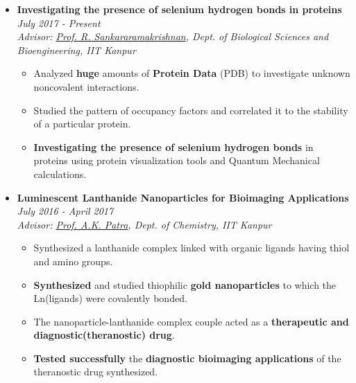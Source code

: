 \documentclass{article}
\begin{document}
\begin{itemize}

\item \textbf{Investigating the presence of selenium hydrogen bonds in proteins}
     \hfill\textit{July 2017 - Present}
     \\[0pt]  \textit{\small	 Advisor: \href{http://home.iitk.ac.in/~rsankar/}{Prof. R. Sankararamakrishnan}, Dept. of Biological Sciences and Bioengineering, IIT Kanpur}  
    \begin{itemize}
        \item Analyzed \textbf{huge} amounts of \textbf{Protein Data} (PDB) to investigate unknown noncovalent interactions.    
        \item Studied the pattern of occupancy factors and correlated it to the stability of a particular protein. 
        \item \textbf{Investigating the presence of selenium hydrogen bonds} in proteins using protein visualization tools and Quantum Mechanical calculations.
        
        \vspace{-1mm}
    \end{itemize}
    \vspace{1.5mm}
     \item \textbf{Luminescent Lanthanide Nanoparticles for Bioimaging Applications}
     \vspace{-1mm}
     \hfill\textit{July 2016 - April 2017}
     \\[3pt]  \textit{\small Advisor: \href{https://sites.google.com/site/ashiskpatra/} {Prof. A.K. Patra}, Dept. of Chemistry, IIT Kanpur } 
    \begin{itemize}
        \item Synthesized a lanthanide complex linked with organic ligands having thiol and amino groups.
        \item \textbf{Synthesized} and studied thiophilic \textbf{gold nanoparticles} to which the Ln(ligands) were covalently bonded.
        \item The nanoparticle-lanthanide complex couple acted as a \textbf{therapeutic and diagnostic(theranostic) drug}.  
     \item \textbf{Tested successfully} the \textbf{diagnostic bioimaging applications} of the theranostic drug synthesized.
    \end{itemize}
    
\end{itemize}
\end{document}
